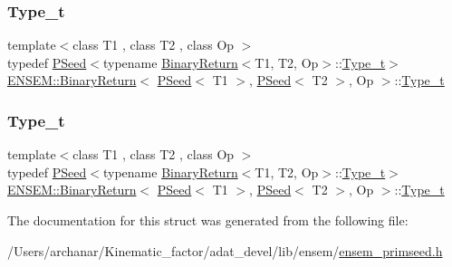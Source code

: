 \subsubsection{\texorpdfstring{Type\_t}{Type\_t}\hspace{0.1cm}{\footnotesize\ttfamily [1/2]}}
{\footnotesize\ttfamily template$<$class T1 , class T2 , class Op $>$ \\
typedef \mbox{\hyperlink{classENSEM_1_1PSeed}{P\+Seed}}$<$typename \mbox{\hyperlink{structENSEM_1_1BinaryReturn}{Binary\+Return}}$<$T1, T2, Op$>$\+::\mbox{\hyperlink{structENSEM_1_1BinaryReturn_3_01PSeed_3_01T1_01_4_00_01PSeed_3_01T2_01_4_00_01Op_01_4_ae3a30c4b21f95d0ccf2ef57c02e76dcb}{Type\+\_\+t}}$>$ \mbox{\hyperlink{structENSEM_1_1BinaryReturn}{E\+N\+S\+E\+M\+::\+Binary\+Return}}$<$ \mbox{\hyperlink{classENSEM_1_1PSeed}{P\+Seed}}$<$ T1 $>$, \mbox{\hyperlink{classENSEM_1_1PSeed}{P\+Seed}}$<$ T2 $>$, Op $>$\+::\mbox{\hyperlink{structENSEM_1_1BinaryReturn_3_01PSeed_3_01T1_01_4_00_01PSeed_3_01T2_01_4_00_01Op_01_4_ae3a30c4b21f95d0ccf2ef57c02e76dcb}{Type\+\_\+t}}}

\mbox{\label{structENSEM_1_1BinaryReturn_3_01PSeed_3_01T1_01_4_00_01PSeed_3_01T2_01_4_00_01Op_01_4_ae3a30c4b21f95d0ccf2ef57c02e76dcb}} 
\subsubsection{\texorpdfstring{Type\_t}{Type\_t}\hspace{0.1cm}{\footnotesize\ttfamily [2/2]}}
{\footnotesize\ttfamily template$<$class T1 , class T2 , class Op $>$ \\
typedef \mbox{\hyperlink{classENSEM_1_1PSeed}{P\+Seed}}$<$typename \mbox{\hyperlink{structENSEM_1_1BinaryReturn}{Binary\+Return}}$<$T1, T2, Op$>$\+::\mbox{\hyperlink{structENSEM_1_1BinaryReturn_3_01PSeed_3_01T1_01_4_00_01PSeed_3_01T2_01_4_00_01Op_01_4_ae3a30c4b21f95d0ccf2ef57c02e76dcb}{Type\+\_\+t}}$>$ \mbox{\hyperlink{structENSEM_1_1BinaryReturn}{E\+N\+S\+E\+M\+::\+Binary\+Return}}$<$ \mbox{\hyperlink{classENSEM_1_1PSeed}{P\+Seed}}$<$ T1 $>$, \mbox{\hyperlink{classENSEM_1_1PSeed}{P\+Seed}}$<$ T2 $>$, Op $>$\+::\mbox{\hyperlink{structENSEM_1_1BinaryReturn_3_01PSeed_3_01T1_01_4_00_01PSeed_3_01T2_01_4_00_01Op_01_4_ae3a30c4b21f95d0ccf2ef57c02e76dcb}{Type\+\_\+t}}}



The documentation for this struct was generated from the following file\+:\begin{DoxyCompactItemize}
\item 
/\+Users/archanar/\+Kinematic\+\_\+factor/adat\+\_\+devel/lib/ensem/\mbox{\hyperlink{lib_2ensem_2ensem__primseed_8h}{ensem\+\_\+primseed.\+h}}\end{DoxyCompactItemize}
